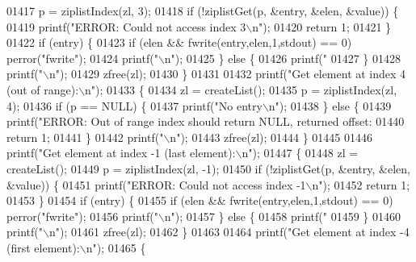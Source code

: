 \begin{DoxyCode}
{{{{{{{{{{{{{{{{{01417         p = ziplistIndex(zl, 3);
01418         \textcolor{keywordflow}{if} (!ziplistGet(p, &entry, &elen, &value)) \{
01419             printf(\textcolor{stringliteral}{"ERROR: Could not access index 3\(\backslash\)n"});
01420             \textcolor{keywordflow}{return} 1;
01421         \}
01422         \textcolor{keywordflow}{if} (entry) \{
01423             \textcolor{keywordflow}{if} (elen && fwrite(entry,elen,1,stdout) == 0) perror(\textcolor{stringliteral}{"fwrite"});
01424             printf(\textcolor{stringliteral}{"\(\backslash\)n"});
01425         \} \textcolor{keywordflow}{else} \{
01426             printf(\textcolor{stringliteral}{"%
01427         \}
01428         printf(\textcolor{stringliteral}{"\(\backslash\)n"});
01429         zfree(zl);
01430     \}
01431 
01432     printf(\textcolor{stringliteral}{"Get element at index 4 (out of range):\(\backslash\)n"});
01433     \{
01434         zl = createList();
01435         p = ziplistIndex(zl, 4);
01436         \textcolor{keywordflow}{if} (p == NULL) \{
01437             printf(\textcolor{stringliteral}{"No entry\(\backslash\)n"});
01438         \} \textcolor{keywordflow}{else} \{
01439             printf(\textcolor{stringliteral}{"ERROR: Out of range index should return NULL, returned offset: %
01440             \textcolor{keywordflow}{return} 1;
01441         \}
01442         printf(\textcolor{stringliteral}{"\(\backslash\)n"});
01443         zfree(zl);
01444     \}
01445 
01446     printf(\textcolor{stringliteral}{"Get element at index -1 (last element):\(\backslash\)n"});
01447     \{
01448         zl = createList();
01449         p = ziplistIndex(zl, -1);
01450         \textcolor{keywordflow}{if} (!ziplistGet(p, &entry, &elen, &value)) \{
01451             printf(\textcolor{stringliteral}{"ERROR: Could not access index -1\(\backslash\)n"});
01452             \textcolor{keywordflow}{return} 1;
01453         \}
01454         \textcolor{keywordflow}{if} (entry) \{
01455             \textcolor{keywordflow}{if} (elen && fwrite(entry,elen,1,stdout) == 0) perror(\textcolor{stringliteral}{"fwrite"});
01456             printf(\textcolor{stringliteral}{"\(\backslash\)n"});
01457         \} \textcolor{keywordflow}{else} \{
01458             printf(\textcolor{stringliteral}{"%
01459         \}
01460         printf(\textcolor{stringliteral}{"\(\backslash\)n"});
01461         zfree(zl);
01462     \}
01463 
01464     printf(\textcolor{stringliteral}{"Get element at index -4 (first element):\(\backslash\)n"});
01465     \{
}}}}}}}}}}}}}}}}}}}}
\end{DoxyCode}
